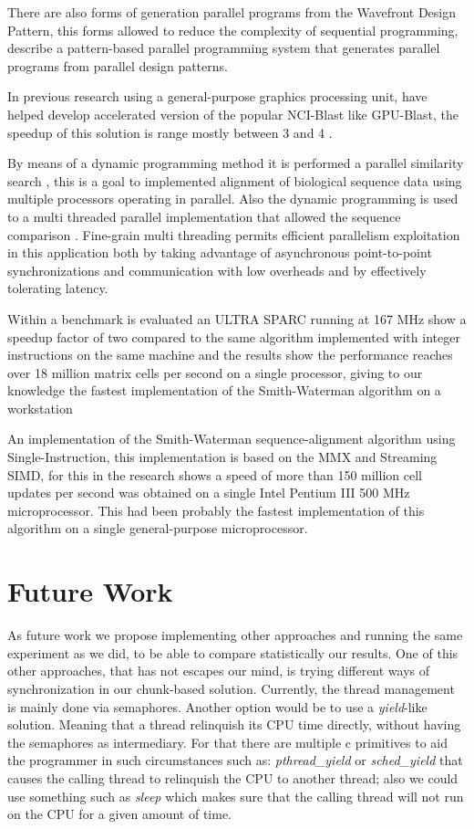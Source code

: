 \documentclass[journal]{IEEEtran}
\begin{document}
There are also forms of generation parallel programs from the Wavefront Design Pattern, this forms allowed to reduce the complexity of sequential programming, \cite{anvik2001generating} describe a pattern-based parallel programming system that generates parallel programs from parallel design patterns.

In previous research using a general-purpose graphics processing unit, have helped develop accelerated version of the popular NCI-Blast like GPU-Blast, the speedup of this solution is range mostly between 3 and 4 \cite{hughey1996parallel}.

By means of a dynamic programming method it is performed a parallel similarity search \cite{galper1990parallel}, this is a goal to implemented alignment of biological sequence data using multiple processors operating in parallel. Also the dynamic programming is used to a multi threaded parallel implementation that allowed the sequence comparison \cite{martins2001multithreaded}. Fine-grain multi threading permits efficient parallelism exploitation in this application both by taking advantage of asynchronous point-to-point synchronizations and communication with low overheads and by effectively tolerating latency.

Within a benchmark is evaluated an ULTRA SPARC running at 167 MHz show a speedup factor of two compared to the same algorithm implemented with integer instructions on the same machine and the results show the performance reaches over 18 million matrix cells per second on a single processor, giving to our knowledge the fastest implementation of the Smith-Waterman algorithm on a workstation \cite{wozniak1997using}

An implementation of the Smith-Waterman sequence-alignment algorithm using Single-Instruction, this implementation is based on the MMX and Streaming SIMD, for this in \cite{rognes2000six} the research shows a speed of more than 150 million cell updates per second was obtained on a single Intel Pentium III 500 MHz microprocessor. This had been probably the fastest implementation of this algorithm on a single general-purpose microprocessor. 


\section{Future Work}

As future work we propose implementing other approaches and running the same experiment as we did, to be able to compare statistically our results. One of this other approaches, that has not escapes our mind, is trying different ways of synchronization in our chunk-based solution. Currently, the thread management is mainly done via semaphores. Another option would be to use a \textit{yield}-like solution. Meaning that a thread relinquish its CPU time directly, without having the semaphores as intermediary. For that there are multiple c primitives to aid the programmer in such circumstances such as: \textit{pthread\_yield} or \textit{sched\_yield} that causes the calling thread to relinquish the CPU to another thread; also we could use something such as \textit{sleep} which makes sure that the calling thread will not run on the CPU for a given amount of time. 
\end{document}
